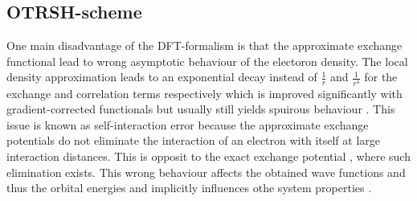 \subsection{OTRSH-scheme}
\label{ch:otrsh}
One main disadvantage of the DFT-formalism is that the approximate exchange functional lead to wrong asymptotic behaviour of the electoron density.
The local density approximation leads to an exponential decay instead of $\frac 1r$ and $\frac{1}{r^4}$ for the exchange and correlation terms respectively \cite{Bokareva} which is improved significantly with gradient-corrected functionals but usually still yields spuirous behaviour \cite{baerRSH}.
This issue is known as self-interaction error because the approximate exchange potentials do not eliminate the interaction of an electron with itself at large interaction distances.
This is opposit to the exact exchange potential , where such elimination exists.
This wrong behaviour affects the obtained wave functions and thus the orbital energies and implicitly influences othe system properties \cite{OT-RSH}.

